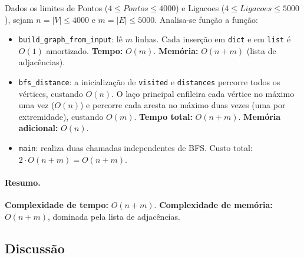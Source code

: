 \documentclass[11pt,a4paper]{article}
\begin{document}
Dados os limites de Pontos ($4 \le Pontos \le 4000$) e Ligacoes ($4 \le Ligacoes \le 5000$), sejam $n = |V| \le 4000$ e $m = |E| \le 5000$. Analisa-se função a
função:

\begin{itemize}
    \item \texttt{build\_graph\_from\_input}: lê $m$ linhas. Cada
    inserção em \texttt{dict} e em \texttt{list} é $O(1)$ amortizado.
    \textbf{Tempo:} $O(m)$. \textbf{Memória:} $O(n+m)$ (lista de
    adjacências).
    \item \texttt{bfs\_distance}: a inicialização de \texttt{visited}
    e \texttt{distances} percorre todos os vértices, custando $O(n)$.
    O laço principal enfileira cada vértice no máximo uma vez ($O(n)$)
    e percorre cada aresta no máximo duas vezes (uma por extremidade), custando $O(m)$. \textbf{Tempo
    total:} $O(n+m)$. \textbf{Memória adicional:} $O(n)$.
    \item \texttt{main}: realiza duas chamadas independentes de BFS.
    Custo total: $2 \cdot O(n+m) = O(n+m)$.
\end{itemize}

\paragraph{Resumo.} \textbf{Complexidade de tempo:} $O(n+m)$.
\textbf{Complexidade de memória:} $O(n+m)$, dominada pela lista de
adjacências.

\subsection{Discussão}
\end{document}
